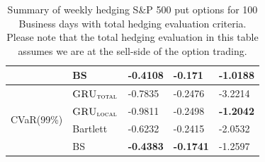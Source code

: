 \documentclass[letterpaper,12pt,titlepage,oneside,final]{book}
\numberwithin{equation}{section}
\theoremstyle{definition}
\newcommand{\modelT}{\textsc{GRU}_{\textsc{total}}}
\newcommand{\modelL}{\textsc{GRU}_{\textsc{local}}}
\begin{document}
\begin{table}[htp!]
\begin{tabular}{ll|l|l|l|}
		\multicolumn{1}{|l|}{}                                & BS       	 &\textbf{-0.4108} &\textbf{-0.171}  &\textbf{-1.0188}          \\ 
		\hline
		\multicolumn{1}{|l|}{\multirow{4}{*}{CVaR(99\%)}}     & $\modelT$    &-0.7835 &-0.2476 &-3.2214 \\  
		\multicolumn{1}{|l|}{}                                & $\modelL$    &-0.9811 &-0.2498 &\textbf{-1.2042}         \\ 
		\multicolumn{1}{|l|}{}                                & Bartlett     &-0.6232 &-0.2415 &-2.0532          \\ 
		\multicolumn{1}{|l|}{}                                & BS       	 &\textbf{-0.4383} &\textbf{-0.1741} &-1.2597          \\ \hline
	\end{tabular}
	\caption{Summary of weekly hedging S\&P 500 put options for 100 Business days with total hedging evaluation criteria. Please note that the total hedging evaluation in this table assumes we are at the sell-side of the option trading.} \label{table:putTotalWBuy}
\end{table}
\end{document}
